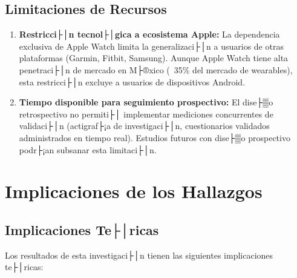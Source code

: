 \subsection{Limitaciones de Recursos}
\label{subsec:limitaciones_recursos}

\begin{enumerate}
    \item \textbf{Restricci├│n tecnol├│gica a ecosistema Apple:} La dependencia exclusiva de Apple Watch limita la generalizaci├│n a usuarios de otras plataformas (Garmin, Fitbit, Samsung). Aunque Apple Watch tiene alta penetraci├│n de mercado en M├®xico (~35\% del mercado de wearables), esta restricci├│n excluye a usuarios de dispositivos Android.
    
    \item \textbf{Tiempo disponible para seguimiento prospectivo:} El dise├▒o retrospectivo no permiti├│ implementar mediciones concurrentes de validaci├│n (actigraf├¡a de investigaci├│n, cuestionarios validados administrados en tiempo real). Estudios futuros con dise├▒o prospectivo podr├¡an subsanar esta limitaci├│n.
\end{enumerate}


\section{Implicaciones de los Hallazgos}
\label{sec:implicaciones}

\subsection{Implicaciones Te├│ricas}
\label{subsec:implicaciones_teoricas}

Los resultados de esta investigaci├│n tienen las siguientes implicaciones te├│ricas:

